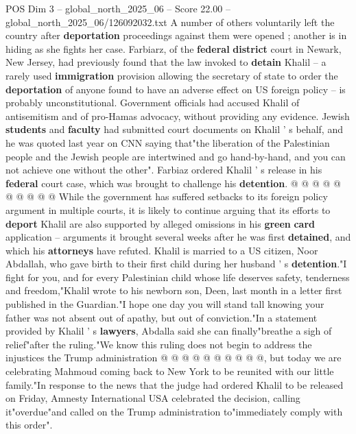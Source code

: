 \begin{textsample}{POS Dim 3 – global\_north\_2025\_06 – Score 22.00 – global\_north\_2025\_06/126092032.txt}
A number of others voluntarily left the country after \textbf{deportation} proceedings against them were opened ; another is in hiding as she fights her case.
Farbiarz, of the \textbf{federal} \textbf{district} court in Newark, New Jersey, had previously found that the law invoked to \textbf{detain} Khalil -- a rarely used \textbf{immigration} provision allowing the secretary of state to order the \textbf{deportation} of anyone found to have an adverse effect on US foreign policy -- is probably unconstitutional.
Government officials had accused Khalil of antisemitism and of pro-Hamas advocacy, without providing any evidence.
Jewish \textbf{students} and \textbf{faculty} had submitted court documents on Khalil ' s behalf, and he was quoted last year on CNN saying that"the liberation of the Palestinian people and the Jewish people are intertwined and go hand-by-hand, and you can not achieve one without the other".
Farbiaz ordered Khalil ' s release in his \textbf{federal} court case, which was brought to challenge his \textbf{detention}. @ @ @ @ @ @ @ @ @ @ While the government has suffered setbacks to its foreign policy argument in multiple courts, it is likely to continue arguing that its efforts to \textbf{deport} Khalil are also supported by alleged omissions in his \textbf{green} \textbf{card} application -- arguments it brought several weeks after he was first \textbf{detained}, and which his \textbf{attorneys} have refuted.
Khalil is married to a US citizen, Noor Abdallah, who gave birth to their first child during her husband ' s \textbf{detention}."I fight for you, and for every Palestinian child whose life deserves safety, tenderness and freedom,"Khalil wrote to his newborn son, Deen, last month in a letter first published in the Guardian."I hope one day you will stand tall knowing your father was not absent out of apathy, but out of conviction."In a statement provided by Khalil ' s \textbf{lawyers}, Abdalla said she can finally"breathe a sigh of relief"after the ruling."We know this ruling does not begin to address the injustices the Trump administration @ @ @ @ @ @ @ @ @ @, but today we are celebrating Mahmoud coming back to New York to be reunited with our little family."In response to the news that the judge had ordered Khalil to be released on Friday, Amnesty International USA celebrated the decision, calling it"overdue"and called on the Trump administration to"immediately comply with this order".

\end{textsample}
